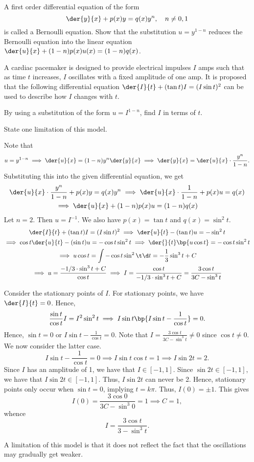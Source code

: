 \begin{problem}
    A first order differential equation of the form \[\der{y}{x} + p(x) y = q(x) y^n, \quad n \neq 0, 1\] is called a Bernoulli equation. Show that the substitution $u = y^{1-n}$ reduces the Bernoulli equation into the linear equation $\der{u}{x} + (1-n)p(x)u(x) = (1-n)q(x)$.

    A cardiac pacemaker is designed to provide electrical impulses $I$ amps such that as time $t$ increases, $I$ oscillates with a fixed amplitude of one amp. It is proposed that the following differential equation $\der{I}{t} + (\tan t) I = (I \sin t)^2$ can be used to describe how $I$ changes with $t$.

    By using a substitution of the form $u = I^{1-n}$, find $I$ in terms of $t$.

    State one limitation of this model.
\end{problem}
\begin{solution}
    Note that \[u = y^{1-n} \implies \der{u}{x} = (1-n)y^n \der{y}{x} \implies \der{y}{x} = \der{u}{x} \cdot \frac{y^n}{1-n}.\] Substituting this into the given differential equation, we get
    \begin{gather*}
        \der{u}{x} \cdot \frac{y^n}{1-n} + p(x)y = q(x) y^n \implies \der{u}{x} \cdot \frac{1}{1-n} + p(x)u = q(x)\\
        \implies \der{u}{x} + (1-n)p(x)u = (1-n)q(x)
    \end{gather*}
    Let $n = 2$. Then $u = I^{-1}$. We also have $p(x) = \tan t$ and $q(x) = \sin^2 t$.
    \begin{gather*}
        \der{I}{t} + (\tan t) I = (I \sin t)^2 \implies \der{u}{t} - (\tan t)u = -\sin^2 t \\
        \implies \cos t \der{u}{t} - (\sin t) u = -\cos t \sin^2 t \implies \der{}{t} \bp{u \cos t} = -\cos t \sin^2 t\\
        \implies u \cos t = \int -\cos t \sin^2 \t \d t = -\frac13 \sin^3 t + C\\
        \implies u = \frac{-1/3 \cdot \sin^3 t + C}{\cos t} \implies I = \frac{\cos t}{-1/3 \cdot \sin^3 t + C} = \frac{3\cos t}{3C - \sin^3 t}
    \end{gather*}
    
    Consider the stationary points of $I$. For stationary points, we have $\der{I}{t} = 0$. Hence, \[\frac{\sin t}{\cos t} I = I^2 \sin^2 t \implies I \sin t \bp{I \sin t - \frac1{\cos t}} = 0.\] Hence, $\sin t = 0$ or $I \sin t - \frac1{\cos t} = 0$. Note that $I = \frac{3\cos t}{3C - \sin^3 t} \neq 0$ since $\cos t \neq 0$. We now consider the latter case. \[I \sin t - \frac1{\cos t} = 0 \implies I \sin t \cos t = 1 \implies I \sin 2t = 2.\] Since $I$ has an amplitude of 1, we have that $I \in [-1, 1]$. Since $\sin 2t \in [-1, 1]$, we have that $I \sin 2t \in [-1, 1]$. Thus, $I \sin 2t$ can never be 2. Hence, stationary points only occur when $\sin t = 0$, implying $t = k\pi$. Thus, $I(0) = \pm 1$. This gives \[I(0) = \frac{3\cos 0}{3C - \sin^3 0} = 1 \implies C = 1,\] whence \[I = \frac{3\cos t}{3 - \sin^3 t}.\]
    
    A limitation of this model is that it does not reflect the fact that the oscillations may gradually get weaker.
\end{solution}